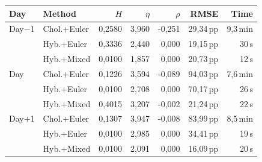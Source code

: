 \begin{tabular}{l l r r r r r}
  \toprule
  \textbf{Day} & \textbf{Method} & \textbf{$H$} & \textbf{$\eta$} & \textbf{$\rho$} & \textbf{RMSE} & \textbf{Time} \\
  \midrule
  Day$-$1 & Chol.+Euler & 0,2580 & 3,960 & -0,251 & 29,34\,pp & 9,3\,min \\
   & Hyb.+Euler & 0,3336 & 2,440 & 0,000 & 19,15\,pp & 30\,s \\
   & Hyb.+Mixed & 0,0100 & 1,857 & 0,000 & 20,73\,pp & 12\,s \\
  \addlinespace[3pt]
  Day & Chol.+Euler & 0,1226 & 3,594 & -0,089 & 94,03\,pp & 7,6\,min \\
   & Hyb.+Euler & 0,0100 & 2,708 & 0,000 & 70,17\,pp & 26\,s \\
   & Hyb.+Mixed & 0,4015 & 3,207 & -0,002 & 21,24\,pp & 22\,s \\
  \addlinespace[3pt]
  Day$+$1 & Chol.+Euler & 0,1307 & 3,947 & -0,008 & 83,99\,pp & 8,5\,min \\
   & Hyb.+Euler & 0,0100 & 2,985 & 0,000 & 34,41\,pp & 19\,s \\
   & Hyb.+Mixed & 0,0100 & 2,091 & 0,000 & 16,09\,pp & 20\,s \\
  \bottomrule
\end{tabular}